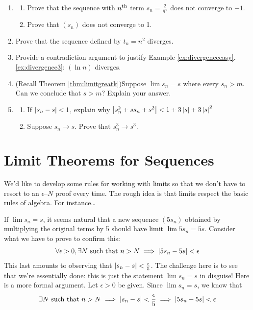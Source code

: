 \begin{exercisessec}{}{}
\begin{enumerate}
 	
  \item\begin{enumerate}
   	\item Prove that the sequence with $n\textsuperscript{th}$ term $s_n=\frac 2{n^2}$ does not converge to $-1$.
		\item Prove that $(s_n)$ does not converge to 1.
	\end{enumerate}
    
  \item Prove that the sequence defined by $t_n=n^2$ diverges.
  
 	
 	\item Provide a contradiction argument to justify Example \ref*{ex:divergenceeasy}.\ref{ex:divergence3}: $(\ln n)$ diverges.

		
	\item (Recall Theorem \ref{thm:limitgreatk})\quad Suppose $\lim s_n=s$ where every $s_n>m$. Can we conclude that $s>m$? Explain your answer.
	
	
	\item\begin{enumerate}
		\item If $\left| s_n-s\right|<1$, explain why $\left| s_n^2+ss_n+s^2\right|< 1+3\left| s\right|+3\left| s\right|^2$
		\item Suppose $s_n\to s$. Prove that $s_n^3\to s^3$.  
	\end{enumerate}
	
\end{enumerate}
\end{exercisessec}

\clearpage




\section{Limit Theorems for Sequences}

We'd like to develop some rules for working with limits so that we don't have to resort to an $\epsilon$--$N$ proof every time. The rough idea is that limits respect the basic rules of algebra. For instance\ldots

\begin{example}{}{}
If $\lim s_n=s$, it seems natural that a new sequence $(5s_n)$ obtained by multiplying the original terms by 5 should have limit $\lim 5s_n=5s$. Consider what we have to prove to confirm this:
\[\forall\epsilon>0, \exists N\text{ such that }n>N\implies \left| 5s_n-5s\right|<\epsilon\]
This last amounts to observing that $\left| s_n-s\right|<\frac\epsilon 5$. The challenge here is to see that we're essentially done: this is just the statement $\lim s_n=s$ in disguise! Here is a more formal argument.\smallbreak
Let $\epsilon>0$ be given. Since $\lim s_n=s$, we know that
\[\exists N\text{ such that }n>N\implies \left| s_n-s\right|<\frac\epsilon 5\implies \left| 5s_n-5s\right|<\epsilon\]
\end{example}

